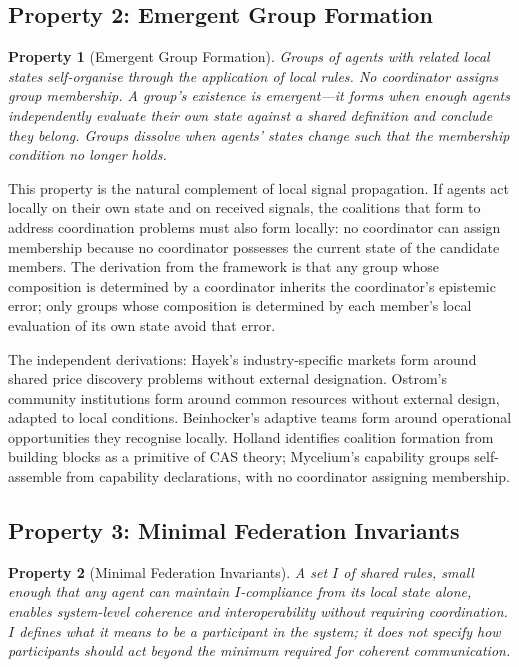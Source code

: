 \documentclass[11pt]{article}
\theoremstyle{definition}
\theoremstyle{plain}
\theoremstyle{plain}
\newtheorem*{property}{Property}
\begin{document}
\subsection{Property 2: Emergent Group Formation}

\begin{property}[Emergent Group Formation]
Groups of agents with related local states self-organise through the
application of local rules. No coordinator assigns group membership. A
group's existence is emergent---it forms when enough agents independently
evaluate their own state against a shared definition and conclude they
belong. Groups dissolve when agents' states change such that the membership
condition no longer holds.
\end{property}

This property is the natural complement of local signal propagation. If
agents act locally on their own state and on received signals, the coalitions
that form to address coordination problems must also form locally: no
coordinator can assign membership because no coordinator possesses the
current state of the candidate members. The derivation from the framework is
that any group whose composition is determined by a coordinator inherits the
coordinator's epistemic error; only groups whose composition is determined by
each member's local evaluation of its own state avoid that error.

The independent derivations: Hayek's industry-specific markets form around
shared price discovery problems without external designation. Ostrom's
community institutions form around common resources without external design,
adapted to local conditions. Beinhocker's adaptive teams form around
operational opportunities they recognise locally. Holland identifies
coalition formation from building blocks as a primitive of CAS theory;
Mycelium's capability groups self-assemble from capability declarations, with
no coordinator assigning membership.

\subsection{Property 3: Minimal Federation Invariants}

\begin{property}[Minimal Federation Invariants]
A set $I$ of shared rules, small enough that any agent can maintain
$I$-compliance from its local state alone, enables system-level coherence and
interoperability without requiring coordination. $I$ defines what it means to
be a participant in the system; it does not specify how participants should
act beyond the minimum required for coherent communication.
\end{property}
\end{document}
